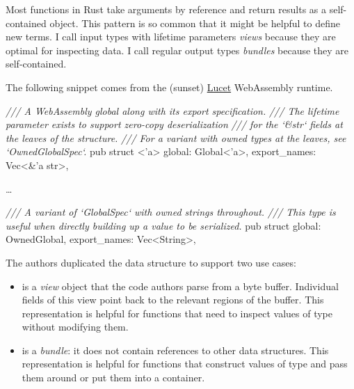 \documentclass{article}
\begin{document}
Most functions in Rust take arguments by reference and return results as a self-contained object.
This pattern is so common that it might be helpful to define new terms.
I call input types with lifetime parameters \emph{views} because they are optimal for inspecting data.
I call regular output types \emph{bundles} because they are self-contained.

The following snippet comes from the (sunset) \href{https://github.com/bytecodealliance/lucet}{Lucet} WebAssembly runtime.
\begin{code}[rust]
\emph{/// A WebAssembly global along with its export specification.}
\emph{/// The lifetime parameter exists to support zero-copy deserialization}
\emph{/// for the `\&str` fields at the leaves of the structure.}
\emph{/// For a variant with owned types at the leaves, see `OwnedGlobalSpec`.}
pub struct \href{https://github.com/bytecodealliance/lucet/blob/51fb1ed414fe44f842db437d94abb6eb439d7c92/lucet-module/src/globals.rs#L8}{}<'a> {
    global: Global<'a>,
    export_names: Vec<&'a str>,
}

\ldots 

\emph{/// A variant of `GlobalSpec` with owned strings throughout.}
\emph{/// This type is useful when directly building up a value to be serialized.}
pub struct \href{https://github.com/bytecodealliance/lucet/blob/51fb1ed414fe44f842db437d94abb6eb439d7c92/lucet-module/src/globals.rs#L112}{} {
    global: OwnedGlobal,
    export_names: Vec<String>,
}
\end{code}

The authors duplicated the  data structure to support two use cases:
\begin{itemize}
  \item
     is a \emph{view} object that the code authors parse from a byte buffer.
    Individual fields of this view point back to the relevant regions of the buffer.
    This representation is helpful for functions that need to inspect values of type  without modifying them.
  \item
     is a \emph{bundle}: it does not contain references to other data structures.
    This representation is helpful for functions that construct values of type  and pass them around or put them into a container.
\end{itemize}
\end{document}
